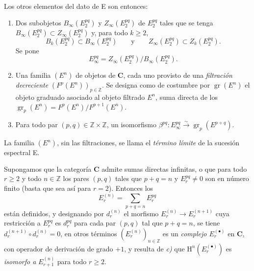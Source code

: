 \begin{env}[11.1.1]
Los otros elementos del dato de E son entonces:
\begin{enumerate}
  \item[$d)$] Dos subobjetos $B_\infty(E_2^{pq})$ y
    $Z_\infty(E_2^{pq})$ de $E_2^{pq}$ tales que se tenga
    $B_\infty(E_2^{pq})\subset Z_\infty(E_2^{pq})$ y, para todo $k\geq2$,
    \[
      B_k(E_2^{pq})\subset B_\infty(E_2^{pq})
      \qquad\text{y}\qquad
      Z_\infty(E_2^{pq})\subset Z_k(E_2^{pq}).
    \]
    Se pone
    \[
    \label{0.11.1.1.3-fr}
      E_\infty^{pq}=Z_\infty(E_2^{pq})/B_\infty(E_2^{pq}).
      \tag{11.1.1.3}
    \]
  \item[$e)$]
    Una familia $(E^n)$ de objetos de $\boldsymbol{C}$, cada uno provisto de una
    \emph{filtración decreciente} $(F^p(E^n))_{p\in\mathbb Z}$. Se designa
    como de costumbre por $\operatorname{gr}(E^n)$ el objeto graduado asociado al
    objeto filtrado $E^n$, suma directa de los
    $\operatorname{gr}_p(E^n)=F^p(E^n)/F^{p+1}(E^n)$.
  \item[$f)$] Para todo par $(p,q)\in\mathbb Z\times\mathbb Z$, un
    isomorfismo
    $\beta^{pq}:E_\infty^{pq}\xrightarrow{\sim}
    \operatorname{gr}_p(E^{p+q})$.
\end{enumerate}

La familia $(E^n)$, sin las filtraciones, se llama el \emph{término límite}
de la sucesión espectral E.

Supongamos que la categoría $\boldsymbol{C}$ admite sumas directas infinitas,
o que para todo $r\geq2$ y todo $n\in\mathbb Z$ los pares $(p,q)$ tales
que $p+q=n$ y $E_r^{pq}\ne0$ son en número finito (basta que sea así
para $r=2$). Entonces los
\[
  E_r^{(n)}=\sum_{p+q=n}E_r^{pq}
\]
están definidos, y designando por $d_r^{(n)}$ el morfismo
$E_r^{(n)}\to E_r^{(n+1)}$ cuya restricción a $E_r^{pq}$ es $d_r^{pq}$
para cada par $(p,q)$ tal que $p+q=n$, se tiene
$d_r^{(n+1)}\circ d_r^{(n)}=0$, en otros términos $(E_r^{(n)})_{n\in\mathbb Z}$
es un \emph{complejo $E_r^{(\bullet)}$} en $\boldsymbol{C}$, con operador de
derivación de grado $+1$, y resulta de \emph{c)} que
$\mathrm H^n(E_r^{(\bullet)})$ es \emph{isomorfo a} $E_{r+1}^{(n)}$ para todo
$r\geq2$.
\end{env}

